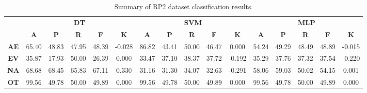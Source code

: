 \begin{landscape}
\begin{table}[htbp]
\footnotesize
\centering
\caption{Summary of RP2 dataset classification results.}
\label{tab:base_female}
\begin{tabular}{|c|c|c|c|c|c|c|c|c|c|c|c|c|c|c|c|}
\hline
\multirow{2}{*}{}	& \multicolumn{5}{c|}{\textbf{DT}}												& \multicolumn{5}{c|}{\textbf{SVM}}												& \multicolumn{5}{c|}{\textbf{MLP}}												\\ \cline{2-16} 
					& \textbf{A}	& \textbf{P}	& \textbf{R}	& \textbf{F}	& \textbf{K}	& \textbf{A}	& \textbf{P}	& \textbf{R}	& \textbf{F}	& \textbf{K}	& \textbf{A}	& \textbf{P}	& \textbf{R}	& \textbf{F}	& \textbf{K}	\\ \hline
\textbf{AE}			& 65.40			& 48.83			& 47.95			& 48.39			& -0.028			& 86.82			& 43.41			& 50.00			& 46.47			& 0.000			& 54.24			& 49.29			& 48.49			& 48.89			& -0.015			\\ \hline
\textbf{EV}			& 35.87			& 17.93			& 50.00			& 26.39			& 0.000			& 33.47			& 37.10			& 38.37			& 37.72			& -0.192			& 35.29			& 37.76			& 37.32			& 37.54			& -0.220			\\ \hline
\textbf{NA}			& 68.68			& 68.45			& 65.83			& 67.11			& 0.330			& 31.16			& 31.30			& 34.07			& 32.63			& -0.291			& 58.06			& 59.03			& 50.02			& 54.15			& 0.001			\\ \hline
\textbf{OT}			& 99.56			& 49.78			& 50.00			& 49.89			& 0.000			& 99.56			& 49.78			& 50.00			& 49.89			& 0.000			& 99.56			& 49.78			& 50.00			& 49.89			& 0.000			\\ \hline
\end{tabular}
\end{table}
\end{landscape}